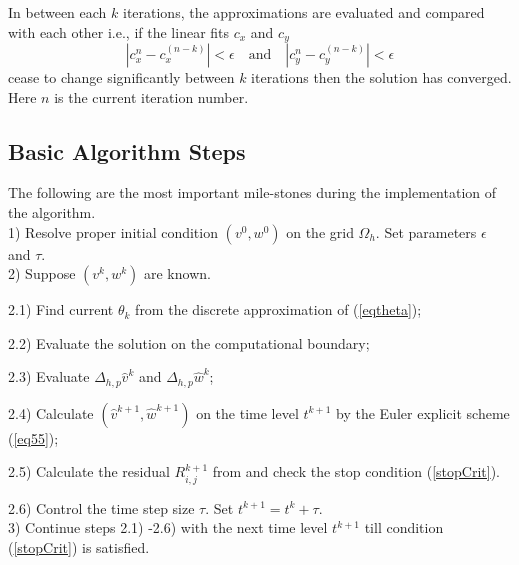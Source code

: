 \documentclass[preprint]{elsarticle}
\newcommand{\rf}[1]{(\ref{#1})}
\begin{document}
In between each $k$ iterations, the approximations are evaluated and compared with each other i.e., if the linear fits $c_{x}$ and $c_{y}$
\begin{equation}\label{stopCrit}
|c_{x}^{n} - c_{x}^{(n-k)}| < \epsilon \quad \textrm{and} \quad |c_{y}^{n} - c_{y}^{(n-k)}| < \epsilon
\end{equation}
cease to change significantly between $k$ iterations then the solution has converged. Here $n$ is the current iteration number.

\subsection{Basic Algorithm Steps}
The following are the most important mile-stones during the implementation of the algorithm.
\\
1) Resolve proper initial condition $(v^0, w^0)$ on the grid $\Omega_h$.  Set parameters $\epsilon$ and $\tau$.
\\
2) Suppose $(v^k, w^k)$ are known. 
\par
2.1) Find current $\theta_k$ from the discrete approximation of \rf{eqtheta};
\par
2.2) Evaluate the solution on the computational boundary;
\par
2.3) Evaluate $\Delta_{h,p}  \widehat{v}^k$ and $\Delta_{h,p}  \widehat{w}^k$;
\par
2.4) Calculate $(\widehat{v}^{k+1}, \widehat{w}^{k+1})$  on the  time level $t^{k+1}$ by the Euler explicit scheme   \rf{eq55};
\par
2.5) Calculate the residual $R^{k+1}_{i,j}$ from and check the stop condition \rf{stopCrit}.
\par
2.6) Control the time step size $\tau$. Set $t^{k+1}=t^{k}+\tau$.
\\
3) Continue steps 2.1) -2.6) with the next time level $t^{k+1}$ till condition (\ref{stopCrit}) is satisfied.
\end{document}
